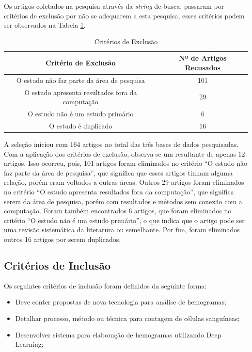 Os artigos coletados na pesquisa através da \emph{string} de busca, passaram por critérios de exclusão por não se adequarem a esta pesquisa, esses critérios podem ser observados na Tabela \ref{tbl:exclusao}. 

\begin{table}[!htb]
	\centering
	\caption{Critérios de Exclusão}
	\label{tbl:exclusao}
	\begin{tabular}{|c|c|}
		\hline
		\textbf{Critério de Exclusão}                    & \textbf{Nº de Artigos Recusados} \\ \hline
		O estudo não faz parte da área de pesquisa       & 101                               \\ \hline
		O estudo apresenta resultados fora da computação & 29                                \\ \hline
		O estudo não é um estudo primário               & 6                                 \\ \hline
		O estudo é duplicado                              & 16                                \\ \hline
	\end{tabular}
	\vspace{6pt}
\end{table}

A seleção iniciou com 164 artigos no total das três bases de dados pesquisadas. Com a aplicação dos critérios de exclusão, observa-se um resultante de apenas 12 artigos. Isso ocorreu, pois, 101 artigos foram eliminados no critério ``O estudo não faz parte da área de pesquisa'', que significa que esses artigos tinham alguma relação, porém eram voltados a outras áreas. Outros 29 artigos foram eliminados no critério ``O estudo apresenta resultados fora da computação'', que significa serem da área de pesquisa, porém com resultados e métodos sem conexão com a computação. Foram também encontrados 6 artigos, que foram eliminados no critério ``O estudo não é um estudo primário'', o que indica que o artigo pode ser uma revisão sistemática da literatura ou semelhante. Por fim, foram eliminados outros 16 artigos por serem duplicados.

\subsection{Critérios de Inclusão}

Os seguintes critérios de inclusão foram definidos da seguinte forma:
\begin{itemize}
	\item Deve conter propostas de nova tecnologia para análise de hemogramas;
	\item Detalhar processo, método ou técnica para contagem de células sanguíneas;
	\item Desenvolver sistema para elaboração de hemogramas utilizando Deep Learning;
\end{itemize}

